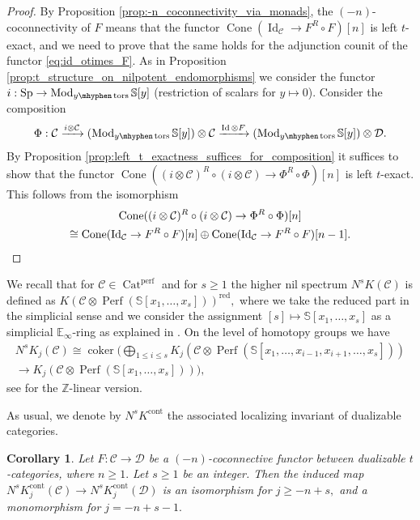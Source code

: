 \documentclass[11pt,leqno]{amsart}
\newtheorem{cor}[theo]{Corollary}
\numberwithin{equation}{section}
\def\bS{\mathbb{S}}
\def\Z{\mathbb{Z}}
\newcommand{\hy}{\mhyphen}
\newcommand{\biggplus}[1][]{\mathop{\bigoplus}\limits_{#1}}
\newcommand{\xto}{\xrightarrow}
\newcommand{\Cat}{\operatorname{Cat}}
\newcommand{\Cone}{\operatorname{Cone}}
\newcommand{\cont}{\operatorname{cont}}
\newcommand{\red}{\operatorname{red}}
\newcommand{\bE}{{\mathbb E}}
\newcommand{\cD}{{\mathcal D}}
\newcommand{\cC}{{\mathcal C}}
\newcommand{\Perf}{\operatorname{Perf}}
\newcommand{\perf}{\operatorname{perf}}
\newcommand{\coker}{\operatorname{coker}}
\newcommand{\Id}{\operatorname{Id}}
\newcommand{\Sp}{\operatorname{Sp}}
\newcommand{\tors}{\operatorname{tors}}
\newcommand{\Mod}{\operatorname{Mod}}
\begin{document}
\begin{proof}
	By Proposition \ref{prop:-n_coconnectivity_via_monads}, the $(-n)$-coconnectivity of $F$ means that the functor $\Cone(\Id_{\cC}\to F^R\circ F)[n]$ is left $t$-exact, and we need to prove that the same holds for the adjunction counit of the functor \eqref{eq:id_otimes_F}. As in Proposition \ref{prop:t_structure_on_nilpotent_endomorphisms} we consider the functor $i:\Sp\to\Mod_{y\hy\tors}\bS[y]$ (restriction of scalars for $y\mapsto 0$). Consider the composition 
\begin{equation*}
		\Phi:\cC\xto{i\otimes\cC}(\Mod_{y\hy\tors}\bS[y])\otimes\cC\xto{\Id\otimes F} (\Mod_{y\hy\tors}\bS[y])\otimes\cD.
\end{equation*}
	By Proposition \ref{prop:left_t_exactness_suffices_for_composition} it suffices to show that the functor
	$\Cone((i\otimes\cC)^R\circ (i\otimes\cC)\to\Phi^R\circ\Phi)[n]$ is left $t$-exact. This follows from the isomorphism
	\begin{multline*}
		\Cone((i\otimes\cC)^R\circ (i\otimes\cC)\to\Phi^R\circ\Phi)[n]\\
		\cong \Cone(\Id_{\cC}\to F^R\circ F)[n]\oplus \Cone(\Id_{\cC}\to F^R\circ F)[n-1].\qedhere
	\end{multline*}
\end{proof}

We recall that for $\cC\in\Cat^{\perf}$ and for $s\geq 1$ the higher nil spectrum $N^s K(\cC)$ is defined as $K(\cC\otimes\Perf(\bS[x_1,\dots,x_s]))^{\red},$ where we take the reduced part in the simplicial sense and we consider the assignment $[s]\mapsto \bS[x_1,\dots,x_s]$ as a simplicial $\bE_{\infty}$-ring as explained in \cite[Section 8]{E25c}. On the level of homotopy groups we have
\begin{multline*}
N^s K_j(\cC)\cong \coker(\biggplus[1\leq i\leq s]K_j(\cC\otimes\Perf(\bS[x_1,\dots,x_{i-1},x_{i+1},\dots,x_s]))\\
\to K_j(\cC\otimes\Perf(\bS[x_1,\dots,x_s]))),
\end{multline*}
see \cite{Wei89} for the $\Z$-linear version.

As usual, we denote by $N^s K^{\cont}$ the associated localizing invariant of dualizable categories.

\begin{cor}\label{cor:coconnectivity_estimates_for_N^s K}
	Let $F:\cC\to\cD$ be a $(-n)$-coconnective functor between dualizable $t$-categories, where $n\geq 1.$ Let $s\geq 1$ be an integer. Then the induced map $N^s K_j^{\cont}(\cC)\to N^s K_j^{\cont}(\cD)$ is an isomorphism for $j\geq -n+s,$ and a monomorphism for $j=-n+s-1.$ %
\end{cor}
\end{document}
